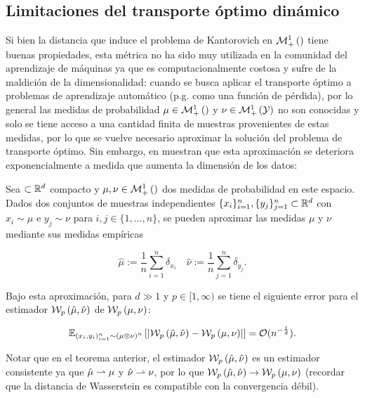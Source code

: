 \subsection{Limitaciones del transporte óptimo dinámico}

Si bien la distancia que induce el problema de Kantorovich en $\mathcal{M}_+^1\left(\right)$ tiene buenas propiedades, esta métrica no ha sido muy utilizada en la comunidad del aprendizaje de máquinas ya que es computacionalmente costosa y sufre de la maldición de la dimensionalidad: cuando se busca aplicar el transporte óptimo a problemas de aprendizaje automático (p.g. como una función de pérdida), por lo general las medidas de probabilidad $\mu\in\mathcal{M}_+^1\left(\right)$ y $\nu\in\mathcal{M}_+^1\left(\mathcal{Y}\right)$ no son conocidas y solo se tiene acceso a una cantidad finita de muestras provenientes de estas medidas, por lo que se vuelve necesario aproximar la solución del problema de transporte óptimo. Sin embargo, en \cite{dudley1969} muestran que esta aproximación se deteriora exponencialmente a medida que aumenta la dimensión de los datos:

\begin{teo}[Dudley]
	Sea $\subset\mathbb{R}^d$ compacto y $\mu,\nu\in\mathcal{M}_+^1\left(\right)$ dos medidas de probabilidad en este espacio. Dados dos conjuntos de muestras independientes $\{x_i\}_{i=1}^n, \{y_j\}_{j=1}^n\subset\mathbb{R}^d$ con $x_i\sim\mu$ e $y_j\sim\nu$ para $i,j\in\{1,\ldots,n\}$, se pueden aproximar las medidas $\mu$ y $\nu$ mediante sus medidas empíricas

	\begin{equation*}
		\hat{\mu} := \frac{1}{n} \sum_{i=1}^n \delta_{x_i}
		\quad
		\hat{\nu} := \frac{1}{n} \sum_{j=1}^n \delta_{y_j} .
	\end{equation*}

	Bajo esta aproximación, para $d\gg 1$ y $p\in[1,\infty)$ se tiene el siguiente error para el estimador $\mathcal{W}_{p}\left(\hat{\mu}, \hat{\nu}\right)$ de $\mathcal{W}_{p}\left(\mu,\nu\right)$:

	\begin{equation*}
		\mathbb{E}_{(x_i,y_i)_{i=1}^n\sim\left(\mu\otimes\nu\right)^n}\left[\left|\mathcal{W}_{p}\left(\hat{\mu}, \hat{\nu}\right) - \mathcal{W}_{p}\left(\mu,\nu\right) \right|\right] = \mathcal{O}(n^{-\frac{1}{d}}) .
	\end{equation*}
\end{teo}

Notar que en el teorema anterior, el estimador $\mathcal{W}_{p}\left(\hat{\mu}, \hat{\nu}\right)$ es un estimador consistente ya que $\hat{\mu}\rightharpoonup \mu$ y $\hat{\nu}\rightharpoonup\nu$, por lo que $\mathcal{W}_{p}\left(\hat{\mu}, \hat{\nu}\right) \to \mathcal{W}_{p}\left(\mu,\nu\right)$ (recordar que la distancia de Wasserstein es compatible con la convergencia débil).

